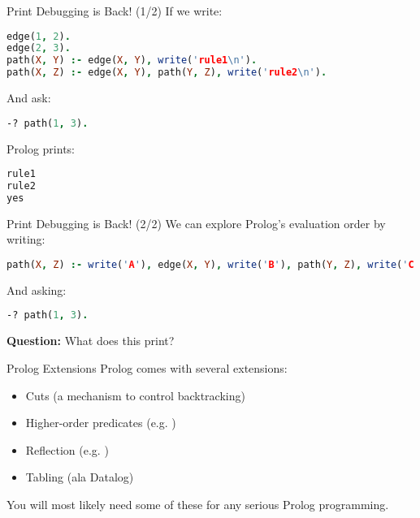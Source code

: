 \begin{frame}[fragile]{Print Debugging is Back! (1/2)}
If we write: 

\begin{lstlisting}[language=prolog, xleftmargin=0.5cm]
edge(1, 2).
edge(2, 3).
path(X, Y) :- edge(X, Y), write('rule1\n').
path(X, Z) :- edge(X, Y), path(Y, Z), write('rule2\n').
\end{lstlisting}

\pause And ask:

\begin{lstlisting}[language=prolog, xleftmargin=0.5cm]
-? path(1, 3).
\end{lstlisting}

\pause Prolog prints:

\begin{lstlisting}[language=prolog, xleftmargin=0.5cm]
rule1
rule2
yes
\end{lstlisting}
\end{frame}

\begin{frame}[fragile]{Print Debugging is Back! (2/2)}
We can explore Prolog's evaluation order by writing:

\begin{lstlisting}[language=prolog, xleftmargin=0.5cm]
path(X, Z) :- write('A'), edge(X, Y), write('B'), path(Y, Z), write('C').
\end{lstlisting}

And asking:

\begin{lstlisting}[language=prolog, xleftmargin=0.5cm]
-? path(1, 3).
\end{lstlisting}

\pause \textbf{Question:} What does this print?
\end{frame}

\begin{frame}{Prolog Extensions}
Prolog comes with several extensions:

\begin{itemize}
    \item Cuts (a mechanism to control backtracking)
    \item Higher-order predicates (e.g. )
    \item Reflection (e.g. )
    \item Tabling (ala Datalog)
\end{itemize}

You will most likely need some of these for any serious Prolog programming. 
\end{frame}

